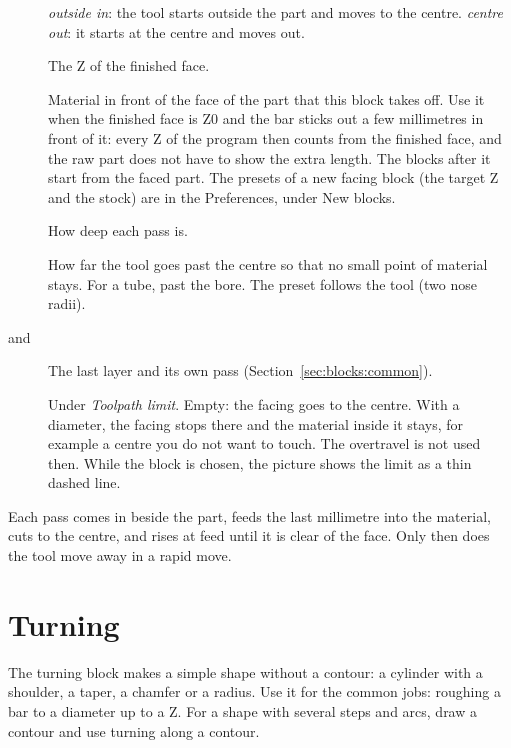 \begin{description}
\item[] \emph{outside in}: the tool starts outside the part and moves to the centre. \emph{centre out}: it starts at the centre and moves out.
\item[] The Z of the finished face.
\item[] Material in front of the face of the part that this block takes off. Use it when the finished face is Z0 and the bar sticks out a few millimetres in front of it: every Z of the program then counts from the finished face, and the raw part does not have to show the extra length. The blocks after it start from the faced part. The presets of a new facing block (the target Z and the stock) are in the Preferences, under New blocks.
\item[] How deep each pass is.
\item[] How far the tool goes past the centre so that no small point of material stays. For a tube, past the bore. The preset follows the tool (two nose radii).
\item[ and ] The last layer and its own pass (Section~\ref{sec:blocks:common}).
\item[] Under \emph{Toolpath limit}. Empty: the facing goes to the centre. With a diameter, the facing stops there and the material inside it stays, for example a centre you do not want to touch. The overtravel is not used then. While the block is chosen, the picture shows the limit as a thin dashed line.
\end{description}

Each pass comes in beside the part, feeds the last millimetre into the material, cuts to the centre, and rises at feed until it is clear of the face. Only then does the tool move away in a rapid move.

\section{Turning}\label{sec:blocks:turning}


The turning block makes a simple shape without a contour: a cylinder with a shoulder, a taper, a chamfer or a radius. Use it for the common jobs: roughing a bar to a diameter up to a Z. For a shape with several steps and arcs, draw a contour and use turning along a contour.

